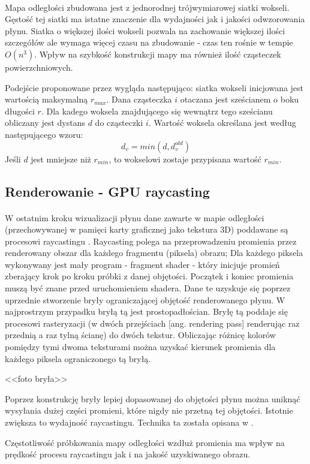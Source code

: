 \paragraph{}
Mapa odległości zbudowana jest z jednorodnej trójwymiarowej siatki wokseli. Gęstość tej siatki ma istatne znaczenie dla wydajności jak i jakości odwzorowania płynu. Siatka o większej ilości wokseli pozwala na zachowanie większej ilości szczegółów ale wymaga więcej czasu na zbudowanie - czas ten rośnie w tempie $O(n^3)$. Wpływ na szybkość konstrukcji mapy ma również ilość cząsteczek powierzchniowych.
\par
Podejście proponowane przez \cite{goswami10} wygląda następująco: siatka wokseli inicjowana jest wartością maksymalną $r_{max}$. Dana cząsteczka $i$ otaczana jest sześcianem o boku długości $r$. Dla kadego woksela znajdującego się wewnątrz tego sześcianu obliczany jest dystans $d$ do cząsteczki $i$. Wartość woksela określana jest według następującego wzoru:
\begin{equation}
d_v = min(d, d_v^{old})
\label{eqn:distance_field}
\end{equation}
Jeśli $d$ jest mniejsze niż $r_{min}$, to wokselowi zostaje przypisana wartość $r_{min}$.
\par


\subsection{Renderowanie - GPU raycasting}

\paragraph{}
W ostatnim kroku wizualizacji płynu dane zawarte w mapie odległości (przechowywanej w pamięci karty graficznej jako tekstura 3D) poddawane są procesowi raycastingu \cite{hadwiger05}. Raycasting polega na przeprowadzeniu promienia przez renderowany obszar dla każdego fragmentu (piksela) obrazu; Dla każdego piksela wykonywany jest mały program - fragment shader - który inicjuje promień zberający krok po kroku próbki z danej objętości. Początek i koniec promienia muszą być znane przed uruchomieniem shadera. Dane te uzyskuje się poprzez uprzednie stworzenie bryły ograniczającej objętość renderowanego płynu. W najprostrzym przypadku bryłą tą jest prostopadłościan. Bryłę tą poddaje się procesowi rasteryzacji (w dwóch przejściach [ang. rendering pass] renderując raz przednią a raz tylną ścianę) do dwóch tekstur. Obliczając różnicę kolorów pomiędzy tymi dwoma teksturami można uzyskać kierunek promienia dla każdego piksela ograniczonego tą bryłą.
\par
<<foto bryła>>
\par
Poprzez konstrukcję bryły lepiej dopasowanej do objętości płynu można uniknąć wysyłania dużej części promieni, które nigdy nie przetną tej objętości. Istotnie zwiększa to wydajność raycastingu. Technika ta została opisana w \cite{@haferburg}.
\par
Częstotliwość próbkowania mapy odległości wzdłuż promienia ma wpływ na prędkość procesu raycastingu jak i na jakość uzyskiwanego obrazu.
\par